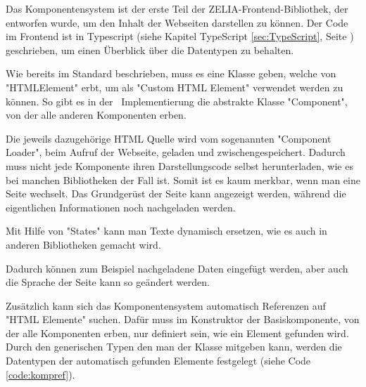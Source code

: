 \label{sec:webcompimp}



Das Komponentensystem ist der erste Teil der ZELIA-Frontend-Bibliothek, der entworfen wurde, um den Inhalt der Webseiten darstellen zu können. Der Code im Frontend ist in Typescript (siehe Kapitel TypeScript \ref{sec:TypeScript}, Seite \pageref{sec:TypeScript}) geschrieben, um einen Überblick über die Datentypen zu behalten.


Wie bereits im Standard beschrieben, muss es eine Klasse geben, welche von "HTMLElement" erbt, um als "Custom HTML Element" verwendet werden zu können. So gibt es in der \ZELIA\ Implementierung die abstrakte Klasse "Component", von der alle anderen Komponenten erben.


Die jeweils dazugehörige HTML Quelle wird vom sogenannten "Component Loader", beim Aufruf der Webseite, geladen und zwischengespeichert. Dadurch muss nicht jede Komponente ihren Darstellungscode selbst herunterladen, wie es bei manchen Bibliotheken der Fall ist. Somit ist es kaum merkbar, wenn man eine Seite wechselt. Das Grundgerüst der Seite kann angezeigt werden, während die eigentlichen Informationen noch nachgeladen werden. 

Mit Hilfe von "States" kann man Texte dynamisch ersetzen, wie es auch in anderen Bibliotheken gemacht wird.



Dadurch können zum Beispiel nachgeladene Daten eingefügt werden, aber auch die Sprache der Seite kann so geändert werden.

Zusätzlich kann sich das Komponentensystem automatisch Referenzen auf "HTML Elemente" suchen. Dafür muss im Konstruktor der Basiskomponente, von der alle Komponenten erben, nur definiert sein, wie ein Element gefunden wird. Durch den generischen Typen den man der Klasse mitgeben kann, werden die Datentypen der automatisch gefunden Elemente festgelegt (siehe Code \ref{code:kompref}).


